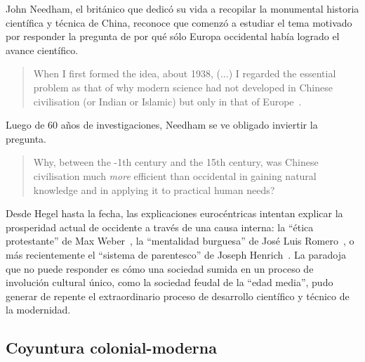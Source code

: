 \documentclass[a4paper,11pt]{book}
\theoremstyle{definition}
\begin{document}
John Needham, el británico que dedicó su vida a recopilar la monumental historia científica y técnica de China, reconoce que comenzó a estudiar el tema motivado por responder la pregunta de por qué sólo Europa occidental había logrado el avance científico.
%
\begin{quotation}
When I first formed the idea, about 1938, (...) I regarded the essential problem as that of why modern science had not developed in Chinese civilisation (or Indian or Islamic) but only in that of Europe~\cite{needham2004-generalConclusionsAndReflections}.%
\end{quotation}
Luego de 60 a\~nos de investigaciones, Needham se ve obligado inviertir la pregunta.
\begin{quotation}
Why, between the -1th century and the 15th century, was Chinese civilisation much \emph{more} efficient than occidental in gaining natural knowledge and in applying it to practical human needs?~\cite{needham2004-generalConclusionsAndReflections}
\end{quotation}


Desde Hegel hasta la fecha, las explicaciones eurocéntricas intentan explicar la prosperidad actual de occidente a través de una causa interna: la ``ética protestante'' de Max Weber~\cite{weber1905-eticaProtestante}, la ``mentalidad burguesa'' de José Luis Romero~\cite{romero1967-revolucionBurguesa}, o más recientemente el ``sistema de parentesco'' de Joseph Henrich~\cite{henrich2020-weirdest}.
%
La paradoja que no puede responder es cómo una sociedad sumida en un proceso de involución cultural único, como la sociedad feudal de la ``edad media'', pudo generar de repente el extraordinario proceso de desarrollo científico y técnico de la modernidad.

\subsection{Coyuntura colonial-moderna}
\end{document}
